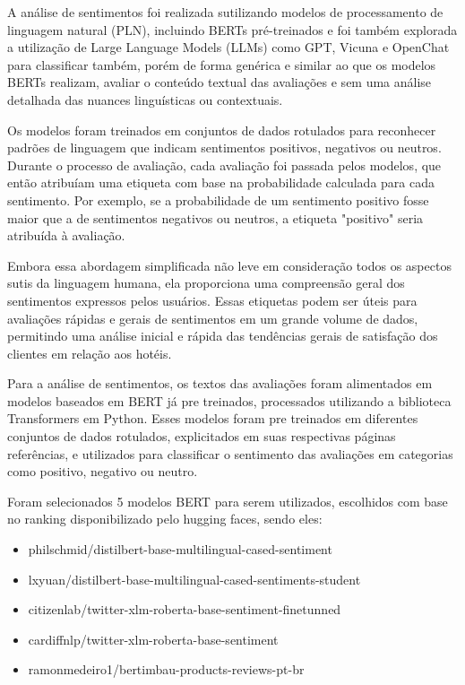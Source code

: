 A análise de sentimentos foi realizada sutilizando modelos de processamento de linguagem natural (PLN), incluindo BERTs pré-treinados e foi também explorada a utilização de Large Language Models (LLMs) como GPT, Vicuna e OpenChat para classificar também, porém de forma genérica e similar ao que os modelos BERTs realizam, avaliar o conteúdo textual das avaliações e sem uma análise detalhada das nuances linguísticas ou contextuais.

Os modelos foram treinados em conjuntos de dados rotulados para reconhecer padrões de linguagem que indicam sentimentos positivos, negativos ou neutros. Durante o processo de avaliação, cada avaliação foi passada pelos modelos, que então atribuíam uma etiqueta com base na probabilidade calculada para cada sentimento. Por exemplo, se a probabilidade de um sentimento positivo fosse maior que a de sentimentos negativos ou neutros, a etiqueta "positivo" seria atribuída à avaliação.

Embora essa abordagem simplificada não leve em consideração todos os aspectos sutis da linguagem humana, ela proporciona uma compreensão geral dos sentimentos expressos pelos usuários. Essas etiquetas podem ser úteis para avaliações rápidas e gerais de sentimentos em um grande volume de dados, permitindo uma análise inicial e rápida das tendências gerais de satisfação dos clientes em relação aos hotéis.



Para a análise de sentimentos, os textos das avaliações foram alimentados em modelos baseados em BERT já pre treinados, processados utilizando a biblioteca Transformers em Python. Esses modelos foram pre treinados em diferentes conjuntos de dados rotulados, explicitados em suas respectivas páginas referências, e utilizados para classificar o sentimento das avaliações em categorias como positivo, negativo ou neutro.

Foram selecionados 5 modelos BERT para serem utilizados, escolhidos com base no ranking disponibilizado pelo hugging faces, sendo eles:
\begin{itemize}
	\item philschmid/distilbert-base-multilingual-cased-sentiment
	\item lxyuan/distilbert-base-multilingual-cased-sentiments-student
	\item citizenlab/twitter-xlm-roberta-base-sentiment-finetunned
	\item cardiffnlp/twitter-xlm-roberta-base-sentiment
	\item ramonmedeiro1/bertimbau-products-reviews-pt-br
\end{itemize}

